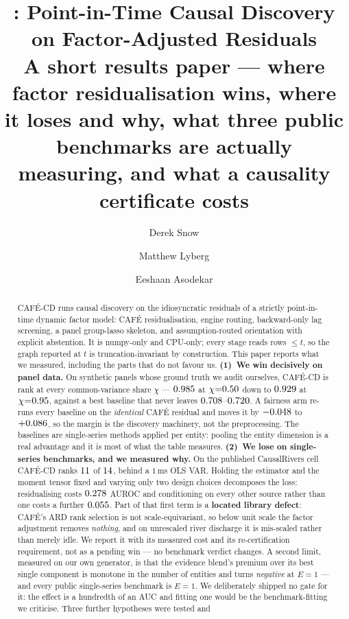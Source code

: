 \documentclass[10pt,twocolumn]{article}
\title{\textbf{\cd{}: Point-in-Time Causal Discovery on
Factor-Adjusted Residuals}\\[3pt]
  {\large\normalfont A short results paper --- where factor residualisation wins,
  where it loses and why, what three public benchmarks are actually measuring, and
  what a causality certificate costs}}
\author[1]{Derek Snow}
\author[1]{Matthew Lyberg}
\author[1]{Eeshaan Asodekar}
\affil[1]{Sovai Research \quad \texttt{d.snow@sov.ai}}
\date{}
\newcommand{\cafe}{CAF\'E}
\DeclareRobustCommand{\cd}{\cafe{}\nobreakdash-CD}
\begin{document}
\maketitle

\begin{abstract}
\noindent
\cd{} runs causal discovery on the idiosyncratic residuals of a strictly
point-in-time dynamic factor model: \cafe{} residualisation, engine routing,
backward-only lag screening, a panel group-lasso skeleton, and assumption-routed
orientation with explicit abstention. It is numpy-only and CPU-only; every stage reads
rows $\le t$, so the graph reported at $t$ is truncation-invariant by construction. This
paper reports what we measured, including the parts that do not favour us.
\textbf{(1)~We win decisively on panel data.} On synthetic panels whose ground truth we
audit ourselves, \cd{} is rank \HHrank{} at every common-variance share $\chi$ ---
$0.985$ at $\chi{=}0.50$ down to $0.929$ at $\chi{=}0.95$, against a best
baseline that never leaves $0.708$--$0.720$. A fairness arm re-runs every
baseline on the \emph{identical} \cafe{} residual and moves it by $-0.048$ to
$+0.086$, so the margin is the discovery machinery, not the preprocessing. The baselines
are single-series methods applied per entity: pooling the entity dimension is a real
advantage and it is most of what the table measures.
\textbf{(2)~We lose on single-series benchmarks, and we measured why.} On the published
CausalRivers cell \cd{} ranks $11$ of $14$, behind a
$1$\,ms OLS VAR. Holding the estimator
and the moment tensor fixed and varying only two design choices decomposes the loss:
residualising costs $0.278$ AUROC and conditioning on every other source rather than
one costs a further $0.055$. Part of that first term is a \textbf{located library
defect}: \cafe{}'s ARD rank selection is not scale-equivariant, so below unit scale the
factor adjustment removes \emph{nothing}, and on unrescaled river discharge it is
mis-scaled rather than merely idle. We report it with its measured cost and its
re-certification requirement, not as a pending win --- no benchmark verdict changes. A
second limit, measured on our own generator, is that the evidence blend's premium over
its best single component is monotone in the number of entities and turns
\emph{negative} at $E{=}1$ --- and every public single-series benchmark is $E{=}1$. We
deliberately shipped no gate for it: the effect is a hundredth of an AUC and fitting one
would be the benchmark-fitting we criticise. Three further hypotheses were tested and

\end{abstract}
\end{document}
